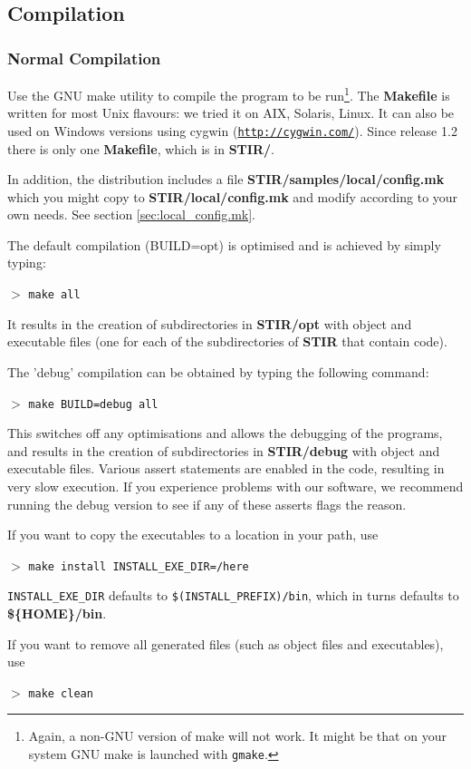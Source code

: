 \documentclass{article}
\def\R2Lurl#1#2{\mbox{\href{#1}{\tt #2}}}
\newcommand{\cmdline}[1]{\par \noindent $>$ \texttt{#1}\par}
\begin{document}
\subsection{
Compilation}

\subsubsection{
Normal Compilation}
\label{sec:normalcompilation}
Use the GNU make utility to compile the program to be run\footnote{{\small Again, 
a non-GNU version of make will not work. It might be that on 
your system GNU make is launched with \texttt{gmake}.}}. The \textbf{Makefile} 
is written for most Unix flavours: we tried it on AIX, Solaris, 
Linux. It can also be used on Windows versions using cygwin (\R2Lurl{http://cygwin.com/}{http://cygwin.com/}). 
Since release 1.2 there is only one \textbf{Makefile}, which is in \textbf{STIR/}.


In addition, the distribution includes a file \textbf{STIR/samples/local/config.mk} 
which you might copy to \textbf{STIR/local/config.mk} and modify according 
to your own needs. See section \ref{sec:local_config.mk}.


The default compilation (BUILD=opt) is optimised and is achieved 
by simply typing:
\cmdline{make all}


It results in the creation of subdirectories in \textbf{STIR/opt} 
with object and executable files (one for each of the subdirectories 
of \textbf{STIR} that contain code).


The 'debug' compilation can be obtained by typing the following 
command:
\cmdline{make BUILD=debug all}
\noindent
This switches off any optimisations and allows the debugging 
of the programs, and results in the creation of subdirectories 
in \textbf{STIR/debug} with object and executable files. Various assert 
statements are enabled in the code, resulting in very slow execution. 
If you experience problems with our software, we recommend running 
the debug version to see if any of these asserts flags the reason.


If you want to copy the executables to a location in your path, 
use
\cmdline{make install INSTALL\_EXE\_DIR=/here}

\noindent
\texttt{INSTALL\_EXE\_DIR} defaults to \texttt{\$(INSTALL\_PREFIX)/bin}, which 
in turns defaults to \textbf{\$\{HOME\}/bin}.


If you want to remove all generated files (such as object files 
and executables), use
\cmdline{make clean}
\end{document}
